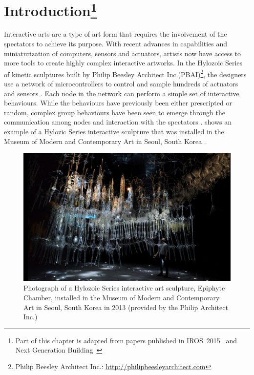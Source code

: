 \chapter[Introduction]{Introduction\footnote{Part of this chapter is adapted from papers published in IROS~2015~\cite{Chan2015} and Next Generation \mbox{Building}~\cite{Gorbet2015}}} 
\label{chap:intro}

Interactive arts are a type of art form that requires the involvement of the spectators to achieve its purpose. With recent advances in capabilities and miniaturization of computers, sensors and actuators, artists now have access to more tools to create highly complex interactive artworks. In the Hylozoic Series of kinetic sculptures built by Philip Beesley Architect Inc.(PBAI)\footnote{Philip Beesley Architect Inc.: \url{http://philipbeesleyarchitect.com}}, the designers use a network of microcontrollers to control and sample hundreds of actuators and sensors \cite{Beesley2010}\cite{Beesley2010-1}. Each node in the network can perform a simple set of interactive behaviours. While the behaviours have previously been either prescripted or random, complex group behaviours have been seen to emerge through the communication among nodes and interaction with the spectators \cite{Beesley2012}.  shows an example of a Hylozic Series interactive sculpture that was installed in the Museum of Modern and Contemporary Art in Seoul, South Korea \cite{PBAISeoul2013}. 

\begin{figure} [!htb]
	\centering
	\includegraphics[width=1.0 \textwidth]{"fig/introduction/PBAI_09"}
	\caption[Photograph of a Hylozoic Series interactive art sculpture, Epiphyte Chamber]{Photograph of a Hylozoic Series interactive art sculpture, Epiphyte Chamber, installed in the Museum of Modern and Contemporary Art in Seoul, South Korea in 2013 (provided by the Philip Architect Inc.)}
	\label{fig:other-sculpture-photo}
\end{figure}


